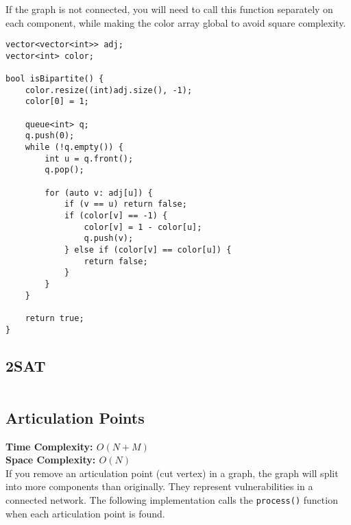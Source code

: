 \begin{remark}
  If the graph is not connected, you will need to call this function
separately on each component, while making the color array global
to avoid square complexity.
\end{remark}

\begin{lstlisting}
vector<vector<int>> adj;
vector<int> color;

bool isBipartite() {
    color.resize((int)adj.size(), -1);
    color[0] = 1;
 
    queue<int> q;
    q.push(0);
    while (!q.empty()) {
        int u = q.front();
        q.pop();
 
        for (auto v: adj[u]) {
            if (v == u) return false;
            if (color[v] == -1) {
                color[v] = 1 - color[u];
                q.push(v);
            } else if (color[v] == color[u]) {
                return false;
            }
        }
    }
 
    return true;
}
\end{lstlisting}

\newpage

\subsection{2SAT}

\hrulefill
\begin{multicols}{2}
\inputminted[autogobble,fontsize=\footnotesize]{C++}{Graphs/2sat.cpp}
\end{multicols}
\hrulefill

\newpage

\subsection{Articulation Points}

\textbf{Time Complexity: $O(N + M)$}\\
\textbf{Space Complexity: $O(N)$}\\

If you remove an articulation point (cut vertex) in a graph,
the graph will split into more components than originally.
They represent vulnerabilities in a connected network.
The following implementation \cite{CutPointsCPAlgo}
calls the \lstinline{process()} function when each articulation
point is found. 

